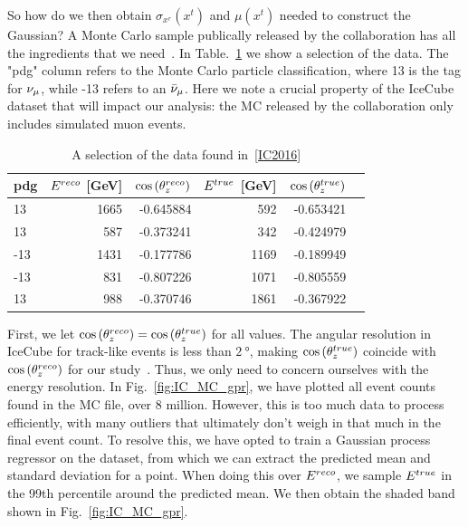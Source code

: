 So how do we then obtain $\sigma_{x^r}(x^t)$ and $\mu(x^t)$ needed to construct the Gaussian? A Monte Carlo sample publically released by the 
collaboration has all the ingredients that we need~\cite{IC2016}. In Table.~\ref{table:IC_MC} we show a selection of the data.
The "pdg" column refers to the Monte Carlo particle classification, where 13 is the tag for $\nu_\mu$, while -13 refers
to an $\bar{\nu}_\mu$. Here we note a crucial property of the IceCube dataset that will impact our analysis: the MC released by the collaboration
only includes simulated muon events.

\begin{table}[h]\label{table:IC_MC}
    \centering
    \begin{tabular}{lrrrrr}
        \hline \hline
        pdg &      $E^{reco}$ [\si{\GeV}] &     $\cos{(\theta_z^{reco})}$ &       $E^{true}$ [\si{\GeV}] &     $\cos{(\theta_z^{true})}$ \\
        \hline
         13 &  1665 & -0.645884 &    592 & -0.653421 \\
         13 &   587 & -0.373241 &    342 & -0.424979 \\
        -13 &  1431 & -0.177786 &   1169 & -0.189949 \\
        -13 &   831 & -0.807226 &   1071 & -0.805559 \\
         13 &   988 & -0.370746 &   1861 & -0.367922 \\
         \hline \hline
  \end{tabular}
  \caption{A selection of the data found in~\ref{IC2016}}
\end{table}

First, we let $\cos{(\theta_z^{reco})} = \cos{(\theta_z^{true})}$ for all values. The angular resolution in IceCube for track-like events is less than $\SI{2}{\degree}$, making $\cos{(\theta_z^{true})}$ coincide with $\cos{(\theta_z^{reco})}$ for our study~\cite{IC2020}.
Thus, we only need to concern ourselves with the energy resolution.
In Fig.~\ref{fig:IC_MC_gpr}, we have plotted all event counts found in the MC file, over 8 million. However, this is too much data to process efficiently, with many outliers that ultimately don't weigh in 
that much in the final event count. To resolve this, we have opted to train a Gaussian process regressor on the dataset, from which we can extract the predicted mean and standard deviation for a point.
When doing this over $E^{reco}$, we sample $E^{true}$ in the 99th percentile around the predicted mean. We then obtain the shaded band shown in Fig.~\ref{fig:IC_MC_gpr}. %

